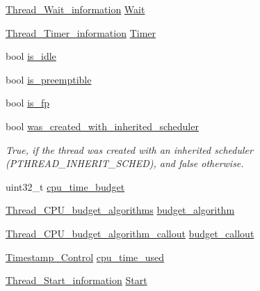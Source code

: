\begin{DoxyCompactItemize}
\mbox{\hyperlink{structThread__Wait__information}{Thread\+\_\+\+Wait\+\_\+information}} \mbox{\hyperlink{struct__Thread__Control_a385c5168e2ba27f7afae4afb3f3d0216}{Wait}}
\item 
\mbox{\hyperlink{structThread__Timer__information}{Thread\+\_\+\+Timer\+\_\+information}} \mbox{\hyperlink{struct__Thread__Control_a920463ad1e3de6c9fefbd66e686c4248}{Timer}}
\item 
bool \mbox{\hyperlink{struct__Thread__Control_adc0e7170ef7f9cea626614d724526e19}{is\+\_\+idle}}
\item 
bool \mbox{\hyperlink{struct__Thread__Control_ac6b2f80121e8f2159365ff557415e1ff}{is\+\_\+preemptible}}
\item 
bool \mbox{\hyperlink{struct__Thread__Control_a5569ce8382eb7faa5dddcc58a8d3c262}{is\+\_\+fp}}
\item 
\mbox{\label{struct__Thread__Control_ab2d669452405d2044c6b671e2dc6de88}} 
bool \mbox{\hyperlink{struct__Thread__Control_ab2d669452405d2044c6b671e2dc6de88}{was\+\_\+created\+\_\+with\+\_\+inherited\+\_\+scheduler}}
\begin{DoxyCompactList}\small\item\em True, if the thread was created with an inherited scheduler (P\+T\+H\+R\+E\+A\+D\+\_\+\+I\+N\+H\+E\+R\+I\+T\+\_\+\+S\+C\+H\+ED), and false otherwise. \end{DoxyCompactList}\item 
uint32\+\_\+t \mbox{\hyperlink{struct__Thread__Control_a41df13f59c5389c807a3eed5013018b4}{cpu\+\_\+time\+\_\+budget}}
\item 
\mbox{\hyperlink{group__RTEMSScoreThread_gab6f48556812ffc781a69df144ef49be0}{Thread\+\_\+\+C\+P\+U\+\_\+budget\+\_\+algorithms}} \mbox{\hyperlink{struct__Thread__Control_afd67f063faf8aa5ad9c5df575f9abcce}{budget\+\_\+algorithm}}
\item 
\mbox{\hyperlink{group__RTEMSScoreThread_ga2f15cbe9653e5bfcb2595454e9ffd14a}{Thread\+\_\+\+C\+P\+U\+\_\+budget\+\_\+algorithm\+\_\+callout}} \mbox{\hyperlink{struct__Thread__Control_afbc0a87d1f48c8ff7beef11f640e63bb}{budget\+\_\+callout}}
\item 
\mbox{\hyperlink{group__SuperCoreTimeStamp_ga8508036506d5211c98844c88045e2410}{Timestamp\+\_\+\+Control}} \mbox{\hyperlink{struct__Thread__Control_a25fc66922c3cc7f7d9e440c54d461a5a}{cpu\+\_\+time\+\_\+used}}
\item 
\mbox{\hyperlink{structThread__Start__information}{Thread\+\_\+\+Start\+\_\+information}} \mbox{\hyperlink{struct__Thread__Control_ad4d5481a7e253ea6411977404341784a}{Start}}

\end{DoxyCompactItemize}
